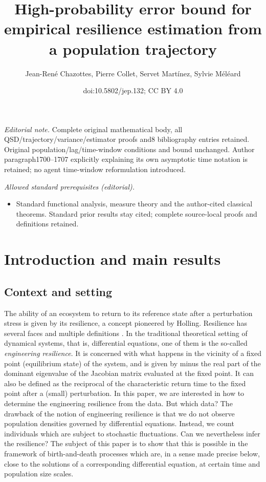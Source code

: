 \documentclass[10pt]{amsart}
\title{High-probability error bound for empirical resilience estimation from a population trajectory}
\author{Jean-René Chazottes, Pierre Collet, Servet Martínez, Sylvie Méléard}
\date{doi:10.5802/jep.132; CC BY 4.0}
\numberwithin{equation}{section}
\theoremstyle{plain}
\theoremstyle{definition}
\begin{document}
\maketitle
\noindent\textit{Editorial note.} Complete original mathematical body, all QSD/trajectory/variance/estimator proofs and8 bibliography entries retained. Original population/lag/time-window conditions and bound unchanged. Author paragraph1700–1707 explicitly explaining its own asymptotic time notation is retained; no agent time-window reformulation introduced.\par\medskip
\noindent\textit{Allowed standard prerequisites (editorial).}\begin{itemize}
\item Standard functional analysis, measure theory and the author-cited classical theorems. Standard prior results stay cited; complete source-local proofs and definitions retained.
\end{itemize}\medskip
\tableofcontents



\section{Introduction and main results}\label{sec:intro}

\subsection{Context and setting}

The ability of an ecosystem to return to its reference state after a perturbation stress is given by its resilience, a concept
pioneered by Holling. Resilience has several faces and multiple definitions \cite{resilience-book}. In the traditional theoretical
setting of dynamical systems, that is, differential equations, one of them is the so-called {\em engineering resilience}. It
is concerned with what happens in the vicinity of a fixed point (equilibrium state) of the system, and is given by minus the real
part of the dominant eigenvalue of the Jacobian matrix evaluated at the fixed point. It can also be defined as the reciprocal of
the characteristic return time to the fixed point after a (small) perturbation.
In this paper, we are interested in how to determine the engineering resilience from the data. But which data?
The drawback of the notion of engineering resilience is that we do not observe population densities governed by differential equations.
Instead, we count individuals which are subject to stochastic fluctuations. Can we nevertheless infer the resilience? The subject of this
paper is to show that this is possible in the framework of birth-and-death processes which are, in a sense made precise below,
close to the solutions of a corresponding differential equation, at certain time and population size scales.
\end{document}
